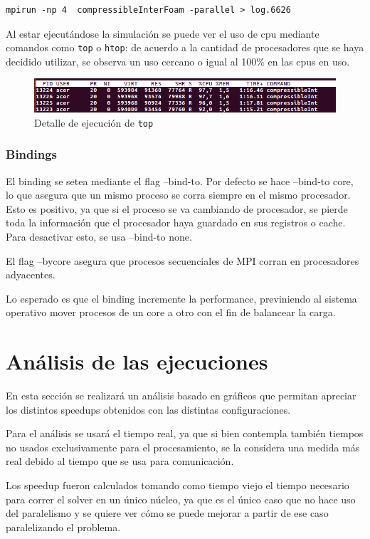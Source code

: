 \documentclass{article}
\begin{document}
\begin{lstlisting}[caption={Ejemplo de comando a ejecutar para resolver con paralelismo.}, captionpos=b]
mpirun -np 4  compressibleInterFoam -parallel > log.6626
\end{lstlisting}

Al estar ejecutándose la simulación se puede ver el uso de cpu mediante comandos como \texttt{top} o \texttt{htop}: de acuerdo a la cantidad de procesadores que se haya decidido utilizar, se observa un uso cercano o igual al 100\% en las cpus en uso.
\begin{figure}[h!]
    \centering
    \includegraphics[scale=0.6]{../res/imgs/image7.png}
    \caption{Detalle de ejecución de \texttt{top}} 
\end{figure}
\subsubsection{Bindings}
El binding se setea mediante el flag --bind-to. Por defecto se hace --bind-to core, lo que asegura que un mismo proceso se corra siempre en el mismo procesador. Esto es positivo, ya que si el proceso se va cambiando de procesador, se pierde toda la información que el procesador haya guardado en sus registros o cache. Para desactivar esto, se usa --bind-to none.

El flag --bycore asegura que procesos secuenciales de MPI corran en procesadores adyacentes.

Lo esperado es que el binding incremente la performance, previniendo al sistema operativo mover procesos de un core a otro con el fin de balancear la carga.

\newpage
\section{Análisis de las ejecuciones}
En esta sección se realizará un análisis basado en gráficos que permitan apreciar los distintos speedups obtenidos con las distintas configuraciones.

Para el análisis se usará el tiempo real, ya que si bien contempla también tiempos no usados exclusivamente para el procesamiento, se la considera una medida más real debido al tiempo que se usa para comunicación. 

Los speedup fueron calculados tomando como tiempo viejo el tiempo necesario para correr el solver en un único núcleo, ya que es el único caso que no hace uso del paralelismo y se quiere ver cómo se puede mejorar a partir de ese caso paralelizando el problema.
\end{document}
